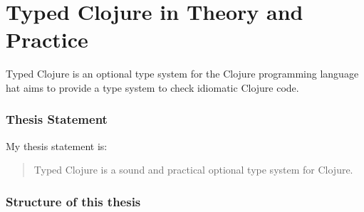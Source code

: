 \part*{Typed Clojure in Theory and Practice}

Typed Clojure is an optional type system for the Clojure programming language
hat aims to provide a type system to check idiomatic Clojure code.

\section*{Thesis Statement}

My thesis statement is:

\begin{quote}
Typed Clojure is a sound and practical optional type system for Clojure.
\end{quote}

%

\section*{Structure of this thesis}

